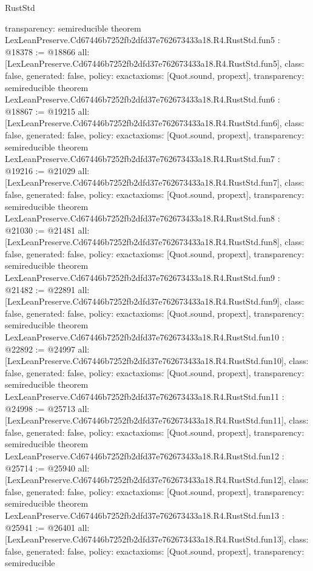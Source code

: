 \begin{lexlean}{RustStd}
\begin{coremodule}
{  transparency: semireducible
}
theorem LexLeanPreserve.Cd67446b7252fb2dfd37e762673433a18.R4.RustStd.fun5 : @18378 := @18866 {
  all: [LexLeanPreserve.Cd67446b7252fb2dfd37e762673433a18.R4.RustStd.fun5],
  class: false,
  generated: false,
  policy: exact{axioms: [Quot.sound, propext]},
  transparency: semireducible
}
theorem LexLeanPreserve.Cd67446b7252fb2dfd37e762673433a18.R4.RustStd.fun6 : @18867 := @19215 {
  all: [LexLeanPreserve.Cd67446b7252fb2dfd37e762673433a18.R4.RustStd.fun6],
  class: false,
  generated: false,
  policy: exact{axioms: [Quot.sound, propext]},
  transparency: semireducible
}
theorem LexLeanPreserve.Cd67446b7252fb2dfd37e762673433a18.R4.RustStd.fun7 : @19216 := @21029 {
  all: [LexLeanPreserve.Cd67446b7252fb2dfd37e762673433a18.R4.RustStd.fun7],
  class: false,
  generated: false,
  policy: exact{axioms: [Quot.sound, propext]},
  transparency: semireducible
}
theorem LexLeanPreserve.Cd67446b7252fb2dfd37e762673433a18.R4.RustStd.fun8 : @21030 := @21481 {
  all: [LexLeanPreserve.Cd67446b7252fb2dfd37e762673433a18.R4.RustStd.fun8],
  class: false,
  generated: false,
  policy: exact{axioms: [Quot.sound, propext]},
  transparency: semireducible
}
theorem LexLeanPreserve.Cd67446b7252fb2dfd37e762673433a18.R4.RustStd.fun9 : @21482 := @22891 {
  all: [LexLeanPreserve.Cd67446b7252fb2dfd37e762673433a18.R4.RustStd.fun9],
  class: false,
  generated: false,
  policy: exact{axioms: [Quot.sound, propext]},
  transparency: semireducible
}
theorem LexLeanPreserve.Cd67446b7252fb2dfd37e762673433a18.R4.RustStd.fun10 : @22892 := @24997 {
  all: [LexLeanPreserve.Cd67446b7252fb2dfd37e762673433a18.R4.RustStd.fun10],
  class: false,
  generated: false,
  policy: exact{axioms: [Quot.sound, propext]},
  transparency: semireducible
}
theorem LexLeanPreserve.Cd67446b7252fb2dfd37e762673433a18.R4.RustStd.fun11 : @24998 := @25713 {
  all: [LexLeanPreserve.Cd67446b7252fb2dfd37e762673433a18.R4.RustStd.fun11],
  class: false,
  generated: false,
  policy: exact{axioms: [Quot.sound, propext]},
  transparency: semireducible
}
theorem LexLeanPreserve.Cd67446b7252fb2dfd37e762673433a18.R4.RustStd.fun12 : @25714 := @25940 {
  all: [LexLeanPreserve.Cd67446b7252fb2dfd37e762673433a18.R4.RustStd.fun12],
  class: false,
  generated: false,
  policy: exact{axioms: [Quot.sound, propext]},
  transparency: semireducible
}
theorem LexLeanPreserve.Cd67446b7252fb2dfd37e762673433a18.R4.RustStd.fun13 : @25941 := @26401 {
  all: [LexLeanPreserve.Cd67446b7252fb2dfd37e762673433a18.R4.RustStd.fun13],
  class: false,
  generated: false,
  policy: exact{axioms: [Quot.sound, propext]},
  transparency: semireducible
}
\end{coremodule}
\end{lexlean}
